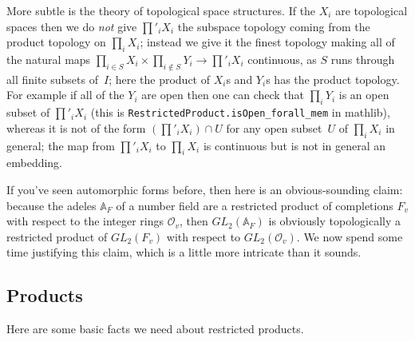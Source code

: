 More subtle is the theory of topological space structures. If the $X_i$
are topological spaces then we do \emph{not} give $\prod'_iX_i$ the subspace
topology coming from the product topology on $\prod_iX_i$; instead we give
it the finest topology making all of the
natural maps $\prod_{i\in S}X_i\times\prod_{i\notin S}Y_i\to \prod'_iX_i$ continuous,
as $S$ runs through all finite subsets of~$I$; here the product of $X_i$s and $Y_i$s
has the product topology. For example if all of the $Y_i$ are open
then one can check that $\prod_iY_i$ is an open subset of
$\prod'_iX_i$ (this is {\tt RestrictedProduct.isOpen\_forall\_mem} in mathlib),
whereas it is not of the form $\left(\prod'_iX_i\right)\cap U$ for any open subset~$U$
of $\prod_iX_i$ in general; the map from $\prod'_i X_i$ to $\prod_i X_i$ is continuous
but is not in general an embedding.

If you've seen automorphic forms before, then here is an obvious-sounding claim:
because the adeles $\mathbb{A}_F$ of a number field are a restricted product of
completions $F_v$ with respect to the integer rings $\mathcal{O}_v$, then
$GL_2(\mathbb{A}_F)$ is obviously topologically a restricted product of
$GL_2(F_v)$ with respect to $GL_2(\mathcal{O}_v)$. We now spend some time justifying
this claim, which is a little more intricate than it sounds.

\subsection{Products}

Here are some basic facts we need about restricted products.

